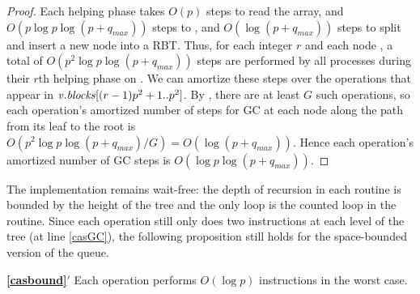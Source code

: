 \begin{proof}
Each helping phase takes $O(p)$ steps to read the  array, and
$O(p \log p \log(p+q_{max}))$ steps to ,
and $O(\log(p+q_{max}))$ steps to split and insert a new node into a RBT.
Thus, for each integer $r$ and each node , a total of $O(p^2\log p\log(p+q_{max}))$ steps
are performed by all processes during their $r$th helping phase on .
We can amortize these steps over the operations that appear in 
$\mbox{\textnormal{\textit{v}}}.\mbox{\textit{blocks}}[(r-1)p^2+1..p^2]$.
By , there are at least $G$ such operations, 
so each operation's amortized number of steps for GC at each node along the path from its leaf to the root
is $O(p^2\log p\log(p+q_{max})/G)=O(\log(p+q_{max}))$.
Hence each operation's amortized number of GC steps is $O(\log p\log(p+q_{max}))$.
\end{proof}

The implementation remains wait-free:  the depth of recursion in each routine is  bounded
by the height of the tree and the only loop is the counted loop in the  routine.
Since each operation still only does two  instructions at each level of the tree (at line \ref{casGC}), the following proposition still holds for the space-bounded version of the queue.

\begin{customprop}{\bf{\ref{casbound}}$'$}
Each operation performs $O(\log p)$  instructions in the worst case.
\end{customprop}
